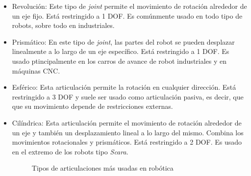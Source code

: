 \begin{itemize}
\item Revolución: Este tipo de \textit{joint} permite el movimiento de rotación alrededor de un eje fijo. Está restringido a 1 DOF. Es comúnmente usado en todo tipo de robots, sobre todo en industriales.
\item Prismático: En este tipo de \textit{joint}, las partes del robot se pueden desplazar linealmente a lo largo de un eje específico. Está restringido a 1 DOF. Es usado ptincipalmente en 
los carros de avance de robot industriales y en máquinas CNC.
\item Esférico: Esta articulación permite la rotación en cualquier dirección. Está restringido a 3 DOF y suele ser usado como articulación pasiva, es decir, que 
que su movimiento depende de restricciones externas.
\item Cilíndrica: Esta articulación permite el movimiento de rotación alrededor de un eje y también un desplazamiento lineal a lo largo del mismo. Combina los movimientos rotacionales y prismáticos. Está restringido a 2 DOF. Es usado en el extremo de los 
robots tipo \textit{Scara}.

\begin{figure} [h!]
  \centering    
  \hspace{1cm}
  \hspace{1cm}
  \caption{Tipos de articulaciones más usadas en robótica}
\end{figure}

\end{itemize}


